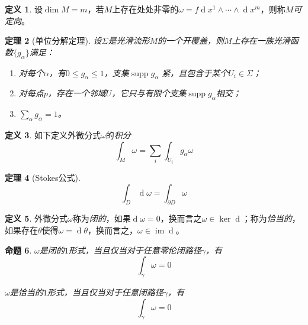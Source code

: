 \documentclass[winfonts,UTF8,c5size,a4paper,fancyhdr,hyperref,titlepage,nocap]{ctexart}
\newtheorem{thm}{定理}
\newtheorem{prop}[thm]{命题}
\theoremstyle{definition}
\newtheorem{defn}[thm]{定义}
\theoremstyle{remark}
\numberwithin{equation}{subsection}
\newcommand{\red}{\color{red}}
\newcommand{\dd}{\operatorname{d}}
\newcommand{\supp}{\operatorname{supp}}
\newcommand{\im}{\operatorname{im}}
\begin{document}
\begin{defn}
  设$\dim M=m$，若$M$上存在处处非零的$\omega=f\dd x^1\wedge\cdots\wedge\dd x^m$，则称$M$\emph{\red 可定向}。
\end{defn}

\begin{thm}[单位分解定理]
设$\Sigma$是光滑流形$M$的一个开覆盖，则$M$上存在一族光滑函数$\{g_{\alpha}\}$满足：
\begin{enumerate}[1)]
    \setlength{\itemindent}{2ex}
    \item 对每个$\alpha$，有$0\leqslant g_{\alpha}\leqslant1$，支集$\supp g_{\alpha}$ 紧，且包含于某个$U_i\in\Sigma$；
    \item 对每点$p$，存在一个邻域$U$，它只与有限个支集$\supp g_{\alpha}$相交；
    \item $\sum_{\alpha}g_{\alpha}=1$。
\end{enumerate}

\end{thm}
\begin{defn}
  如下定义外微分式$\omega$的\emph{\red 积分}
  \begin{equation*}
    \int_{M}\omega=\sum_i\int_{U_i}g_{\alpha}\omega
  \end{equation*}
\end{defn}

\begin{thm}[Stokes公式]
\begin{equation*}
\int_D\dd\omega=\int_{\partial D}\omega
\end{equation*}
\end{thm}

\begin{defn}
  外微分式$\omega$称为\emph{\red 闭的}，如果$\dd\omega=0$，换而言之$\omega\in\ker\dd$；称为\emph{\red 恰当的}，如果存在$\theta$使得$\omega=\dd\theta$，换而言之，$\omega\in\im\dd$。
\end{defn}
\begin{prop}
  $\omega$是闭的$1$形式，当且仅当对于任意零伦闭路径$\gamma$，有
\begin{equation*}
\int_{\gamma}\omega=0
\end{equation*}

$\omega$是恰当的$1$形式，当且仅当对于任意闭路径$\gamma$，有
\begin{equation*}
\int_{\gamma}\omega=0
\end{equation*}
\end{prop}
\end{document}
